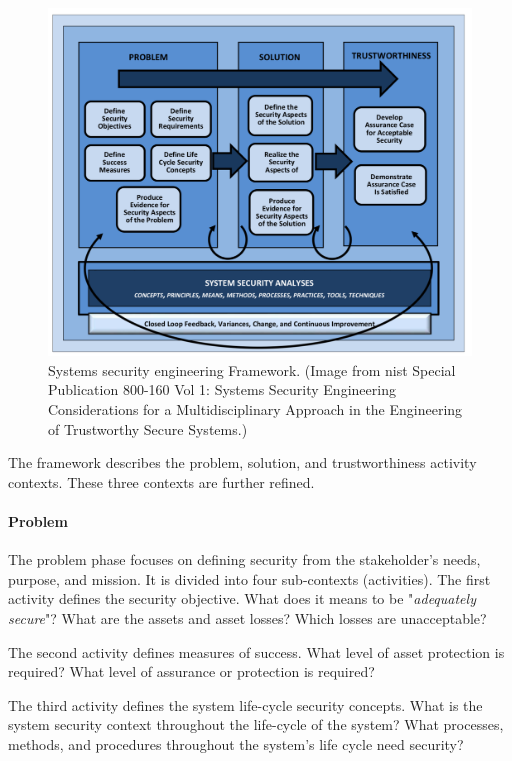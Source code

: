 \documentclass[../../main/main.tex]{subfiles}
\begin{document}
\begin{figure}[h]
\includegraphics[width=\linewidth]{../figures/sseframework}
\caption{\label{sseframework}Systems security engineering Framework. (Image from \gls{nist} Special Publication 800-160 Vol 1: Systems Security Engineering Considerations for a Multidisciplinary Approach in the Engineering of Trustworthy Secure Systems.\cite{NIST800160})}
\end{figure}

The framework describes the problem, solution, and trustworthiness activity contexts.  These three contexts are further refined. 
\paragraph*{Problem}
The problem phase focuses on defining security from the stakeholder's needs, purpose, and mission.  It is divided into four sub-contexts (activities).  The first activity defines the security objective. What does it means to be "\textit{adequately secure}"?   What are the assets and asset losses?  Which losses are unacceptable?
 
The second activity defines measures of success.  What level of asset protection is required?  What level of assurance or protection is required?  

The third activity defines the system life-cycle security concepts.  What is the system security context throughout the life-cycle of the system?  What processes, methods, and procedures throughout the system's life cycle need security?  
\end{document}
